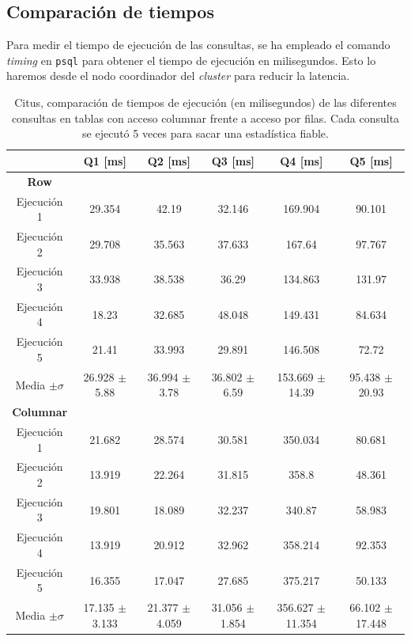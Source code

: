 \subsection*{Comparación de tiempos}

Para medir el tiempo de ejecución de las consultas, se ha empleado el comando \textit{timing} en \texttt{psql} para obtener el tiempo de ejecución en milisegundos. Esto lo haremos desde el nodo coordinador del \textit{cluster} para reducir la latencia. \\

\begin{table}[H]
\centering
\begin{tabular}{cccccc}
\hline
 & Q1 [ms] & Q2 [ms] & Q3 [ms] & Q4 [ms] & Q5 [ms] \\
\hline\hline
\textbf{Row} & & & & & \\
\hline
Ejecución 1 & 29.354 & 42.19 & 32.146 & 169.904 & 90.101 \\
Ejecución 2 & 29.708 & 35.563 & 37.633 & 167.64 & 97.767 \\
Ejecución 3 & 33.938 & 38.538 & 36.29 & 134.863 & 131.97 \\
Ejecución 4 & 18.23 & 32.685 & 48.048 & 149.431 & 84.634 \\
Ejecución 5 & 21.41 & 33.993 & 29.891 & 146.508 & 72.72 \\ \hline
Media $\pm \sigma$ & 26.928 $\pm$ 5.88 & 36.994 $\pm$ 3.78 & 36.802 $\pm$ 6.59 & 153.669 $\pm$ 14.39 & 95.438 $\pm$ 20.93 \\ \hline\hline
\textbf{Columnar} & & & & & \\
\hline\hline
Ejecución 1 & 21.682 & 28.574 & 30.581 & 350.034 & 80.681 \\
Ejecución 2 & 13.919 & 22.264 & 31.815 & 358.8 & 48.361 \\
Ejecución 3 & 19.801 & 18.089 & 32.237 & 340.87 & 58.983 \\
Ejecución 4 & 13.919 & 20.912 & 32.962 & 358.214 & 92.353 \\
Ejecución 5 & 16.355 & 17.047 & 27.685 & 375.217 & 50.133 \\\hline
Media $\pm \sigma$ & 17.135 $\pm$ 3.133 & 21.377 $\pm$ 4.059 & 31.056 $\pm$ 1.854 & 356.627 $\pm$ 11.354 & 66.102 $\pm$ 17.448 \\
\hline
\end{tabular}
\caption{Citus, comparación de tiempos de ejecución (en milisegundos) de las diferentes consultas en tablas con acceso columnar frente a acceso por filas. Cada consulta se ejecutó 5 veces para sacar una estadística fiable.}
\label{fig:citus_tiempos}
\end{table}

